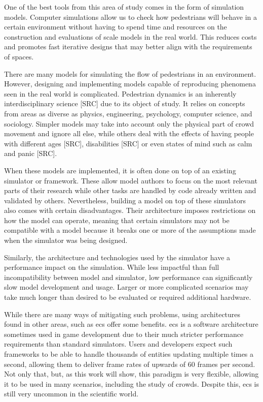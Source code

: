 \documentclass[twoside, 11pt]{article}
\begin{document}
One of the best tools from this area of study comes in the form of simulation models. Computer simulations allow us to check how pedestrians will behave in a certain environment without having to spend time and resources on the construction and evaluations of scale models in the real world. This reduces costs and promotes fast iterative designs that may better align with the requirements of spaces.

There are many models for simulating the flow of pedestrians in an environment. However, designing and implementing models capable of reproducing phenomena seen in the real world is complicated. Pedestrian dynamics is an inherently interdisciplinary science [SRC] due to its object of study. It relies on concepts from areas as diverse as physics, engineering, psychology, computer science, and sociology. Simpler models may take into account only the physical part of crowd movement and ignore all else, while others deal with the effects of having people with different ages [SRC], disabilities [SRC] or even states of mind such as calm and panic [SRC].

When these models are implemented, it is often done on top of an existing simulator or framework. These allow model authors to focus on the most relevant parts of their research while other tasks are handled by code already written and validated by others. Nevertheless, building a model on top of these simulators also comes with certain disadvantages. Their architecture imposes restrictions on how the model can operate, meaning that certain simulators may not be compatible with a model because it breaks one or more of the assumptions made when the simulator was being designed.

Similarly, the architecture and technologies used by the simulator have a performance impact on the simulation. While less impactful than full incompatibility between model and simulator, low performance can significantly slow model development and usage. Larger or more complicated scenarios may take much longer than desired to be evaluated or required additional hardware.

While there are many ways of mitigating such problems, using architectures found in other areas, such as \gls{ecs} offer some benefits. \gls{ecs} is a software architecture sometimes used in game development due to their much stricter performance requirements than standard simulators. Users and developers expect such frameworks to be able to handle thousands of entities updating multiple times a second, allowing them to deliver frame rates of upwards of 60 frames per second. Not only that, but, as this work will show, this paradigm is very flexible, allowing it to be used in many scenarios, including the study of crowds. Despite this, \gls{ecs} is still very uncommon in the scientific world.
\end{document}
